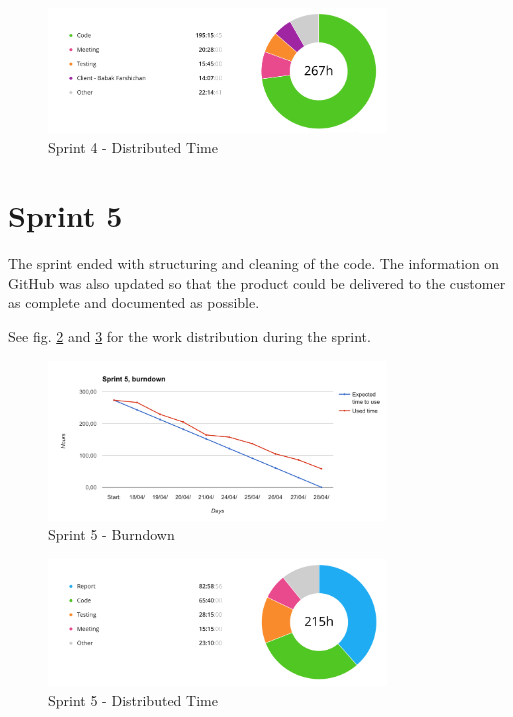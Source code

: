 \begin{figure}[ht]
\centering
    \includegraphics[width=0.8\textwidth]{fig/sprint4-diagram}
\caption{Sprint 4 - Distributed Time}
\label{sprint4_diagram}
\end{figure}

\section{Sprint 5}
\label{Sprints-sprint5}

The sprint ended with structuring and cleaning of the code. The information on GitHub was also updated so that the product could be delivered to the customer as complete and documented as possible.

See fig. \ref{sprint5_burndown} and \ref{sprint5_diagram} for the work distribution during the sprint.

\begin{figure}[ht]
\centering
    \includegraphics[width=0.8\textwidth]{fig/sprint5}
\caption{Sprint 5 - Burndown}
\label{sprint5_burndown}
\end{figure}

\begin{figure}[ht]
\centering
    \includegraphics[width=0.8\textwidth]{fig/sprint5-diagram}
\caption{Sprint 5 - Distributed Time}
\label{sprint5_diagram}
\end{figure}

